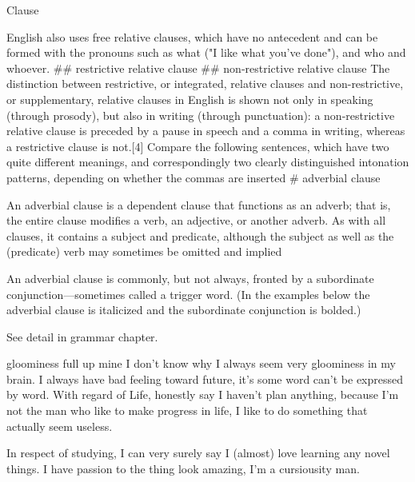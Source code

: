 \begin{writing}[18-8-24]{Clause}
\begin{easylist}[checklist]
{    English also uses free relative clauses, which have no antecedent and can be formed 
    with the pronouns such as what ("I like what you've done"), and who and whoever.
    }
## restrictive relative clause
## non-restrictive relative clause\newline
    {\color{gray}
    The distinction between restrictive, or integrated, relative clauses and non-restrictive, 
    or supplementary, relative clauses in English is shown not only in speaking (through 
    prosody), but also in writing (through punctuation): a non-restrictive relative 
    clause is preceded by a pause in speech and a comma in writing, whereas 
    a restrictive clause is not.[4] Compare the following sentences, which have 
    two quite different meanings, and correspondingly two clearly distinguished intonation patterns, depending on 
    whether the commas are inserted}
# adverbial clause\newline
    {\color{gray}
    An adverbial clause is a dependent clause that functions as an adverb; that is,
    the entire clause modifies a verb, an adjective, or another adverb. 
    As with all clauses, it contains a subject and predicate, although the subject 
    as well as the (predicate) verb may sometimes be omitted and implied 

    An adverbial clause is commonly, but not always, fronted by a subordinate conjunction—sometimes 
    called a trigger word. (In the examples below the adverbial clause is italicized 
    and the subordinate conjunction is bolded.)
    }
\end{easylist}
See detail in grammar chapter.
\end{writing}

\begin{writing}[18-8-28]{gloominess full up mine}
    I don't know why I always seem very  gloominess in my brain.
    I always have bad feeling toward future, it's some word can't be expressed by word.
    With regard of Life, honestly say I haven't plan anything, because I'm not the man
    who like to make progress in life, I like to do something that actually seem useless.

    In respect of studying, I can very surely say I (almost) love learning any novel things.
    I have passion to the thing look amazing, I'm a cursiousity man.
\end{writing}

